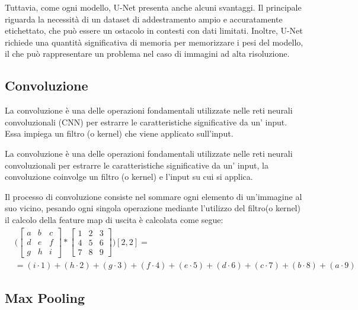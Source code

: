 Tuttavia, come ogni modello, U-Net presenta anche alcuni svantaggi. Il principale riguarda la
necessità di un dataset di addestramento ampio e accuratamente etichettato, che può essere un
ostacolo in contesti con dati limitati. Inoltre, U-Net richiede una quantità significativa di
memoria per memorizzare i pesi del modello, il che può rappresentare un problema nel caso di
immagini ad alta risoluzione.


\subsection{Convoluzione}
\label{sec:convoluzione}

La convoluzione è una delle operazioni fondamentali utilizzate nelle reti neurali convoluzionali
(CNN) per estrarre le caratteristiche significative da un' input. Essa impiega un filtro (o kernel)
che viene applicato sull'input.

La convoluzione è una delle operazioni fondamentali utilizzate nelle reti
neurali convoluzionali per estrarre le caratteristiche significative da un'
input, la convoluzione coinvolge un filtro (o kernel) e l'input su cui si
applica.

Il processo di convoluzione consiste nel sommare ogni elemento di un'immagine
al suo vicino, pesando ogni singola operazione mediante l'utilizzo del filtro(o
kernel) il calcolo della feature map di uscita è calcolata come segue:
\begin{align}
	 & \Bigg( \begin{bmatrix}
		          a & b & c \\
		          d & e & f \\
		          g & h & i
	          \end{bmatrix}
	*
	\begin{bmatrix}
		1 & 2 & 3 \\
		4 & 5 & 6 \\
		7 & 8 & 9
	\end{bmatrix}
	\Bigg) [2, 2] =                                                                                                                  \\
	 & = (i \cdot 1) + (h \cdot 2) + (g \cdot 3) + (f \cdot 4) + (e \cdot 5) + (d \cdot 6) + (c \cdot 7) + (b \cdot 8) + (a \cdot 9)
\end{align}


\subsection{Max Pooling}
\label{sec:max_pooling}

